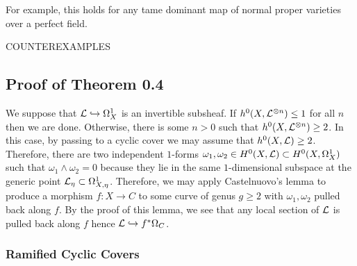\documentclass[main.tex]{subfiles}
\begin{document}
\begin{rmk}
For example, this holds for any tame dominant map of normal proper varieties over a perfect field.
\end{rmk}

{\color{red} COUNTEREXAMPLES}

\subsection{Proof of Theorem 0.4}

We suppose that $\mathcal{L} \hookrightarrow \Omega_X^1$ is an invertible subsheaf. If $h^0(X, \mathcal{L}^{\otimes n}) \le 1$ for all $n$ then we are done. Otherwise, there is some $n > 0$ such that $h^0(X, \mathcal{L}^{\otimes n}) \ge 2$. In this case, by passing to a cyclic cover we may assume that $h^0(X, \mathcal{L}) \ge 2$. Therefore, there are two independent $1$-forms $\omega_1, \omega_2 \in H^0(X, \mathcal{L}) \subset H^0(X, \Omega^1_X)$ such that $\omega_1 \wedge \omega_2 = 0$ because they lie in the same $1$-dimensional subspace at the generic point $\mathcal{L}_{\eta} \subset \Omega_{X, \eta}^1$. Therefore, we may apply Castelnuovo's lemma to produce a morphism $f : X \to C$ to some curve of genus $g \ge 2$ with $\omega_1, \omega_2$ pulled back along $f$. By the proof of this lemma, we see that any local section of $\mathcal{L}$ is pulled back along $f$ hence $\mathcal{L} \hookrightarrow f^* \Omega_C$.

\subsubsection{Ramified Cyclic Covers}
\end{document}
